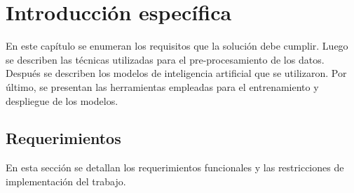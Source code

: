 \chapter{Introducción específica} %

\label{Chapter2}

En este capítulo se enumeran los requisitos que la solución debe cumplir. Luego se describen las técnicas utilizadas para el pre-procesamiento de los datos. Después se describen los modelos de inteligencia artificial que se utilizaron. Por último, se presentan las herramientas empleadas para el entrenamiento y despliegue de los modelos.

\section{Requerimientos}

En esta sección se detallan los requerimientos funcionales y las restricciones de implementación del trabajo.


